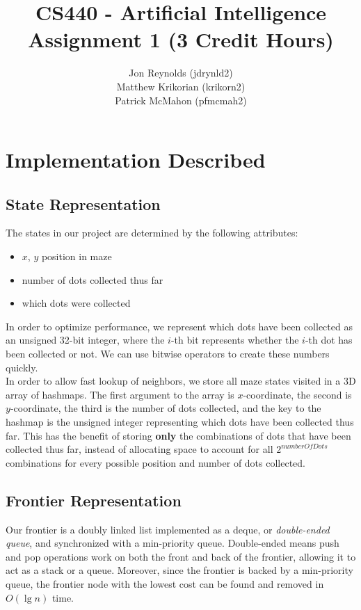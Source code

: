 \documentclass[titlepage]{article}
\title{CS440 - Artificial Intelligence \\ Assignment 1 (3 Credit Hours)}
\author{Jon Reynolds (jdrynld2) \\ Matthew Krikorian (krikorn2) \\ Patrick McMahon (pfmcmah2)}
\begin{document}
\maketitle

\section*{Implementation Described}
\subsection*{State Representation}
The states in our project are determined by the following attributes:
\begin{itemize}
\item $x$, $y$ position in maze
\item number of dots collected thus far
\item which dots were collected
\end{itemize}
In order to optimize performance, we represent which dots have been collected as an unsigned 32-bit integer, where the $i$-th bit represents whether the $i$-th dot has been collected or not. We can use bitwise operators to create these numbers quickly.\\


\noindent In order to allow fast lookup of neighbors, we store all maze states visited in a 3D array of hashmaps. The first argument to the array is $x$-coordinate, the second is $y$-coordinate, the third is the number of dots collected, and the key to the hashmap is the unsigned integer representing which dots have been collected thus far. This has the benefit of storing \textbf{only} the combinations of dots that have been collected thus far, instead of allocating space to account for all $2^{\textit{numberOfDots}}$ combinations for every possible position and number of dots collected.
\subsection*{Frontier Representation}

Our frontier is a doubly linked list implemented as a deque, or \textit{double-ended queue}, and synchronized with a min-priority queue.  Double-ended means push and pop operations work on both the front and back of the frontier, allowing it to act as a stack or a queue. Moreover, since the frontier is backed by a min-priority queue, the frontier node with the lowest cost can be found and removed in $O(\lg n)$ time.\\
\end{document}
